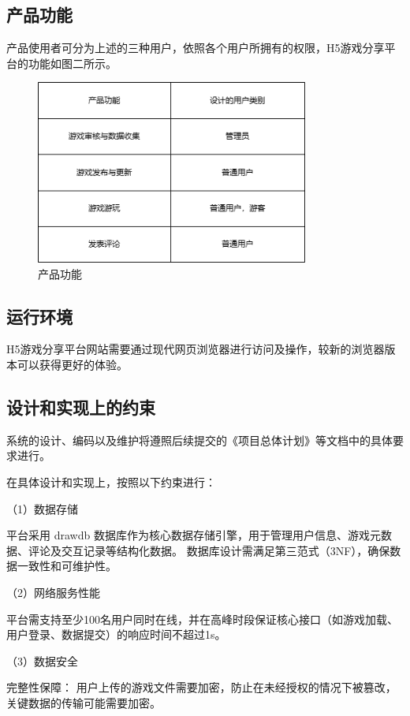\documentclass[12pt]{ctexart} %
\begin{document}
\subsection{产品功能}
产品使用者可分为上述的三种用户，依照各个用户所拥有的权限，H5游戏分享平台的功能如图二所示。

\begin{figure}[htbp]
  \centering
  \includegraphics[width=0.8\textwidth]{function.png}
  \caption{产品功能}
  \label{f2}
\end{figure}

\subsection{运行环境}
H5游戏分享平台网站需要通过现代网页浏览器进行访问及操作，较新的浏览器版本可以获得更好的体验。

\subsection{设计和实现上的约束}
系统的设计、编码以及维护将遵照后续提交的《项目总体计划》等文档中的具体要求进行。

在具体设计和实现上，按照以下约束进行：

（1）数据存储

平台采用 drawdb 数据库作为核心数据存储引擎，用于管理用户信息、游戏元数据、评论及交互记录等结构化数据。
数据库设计需满足第三范式（3NF），确保数据一致性和可维护性。

（2）网络服务性能

平台需支持至少100名用户同时在线，并在高峰时段保证核心接口（如游戏加载、用户登录、数据提交）的响应时间不超过1s。

（3）数据安全

完整性保障：
用户上传的游戏文件需要加密，防止在未经授权的情况下被篡改，关键数据的传输可能需要加密。
\end{document}
